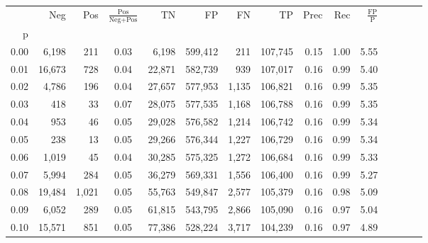 \begin{tabular}{rrrcrrrrrrrrrrr}
\toprule
{} &     Neg &    Pos & $\frac{\text{Pos}}{\text{Neg}+\text{Pos}}$ &       TN &       FP &       FN &       TP &  Prec &   Rec & $\frac{\text{FP}}{\text{P}}$ \\
p    &         &        &                                            &          &          &          &          &       &       &                              \\
\midrule
0.00 &   6,198 &    211 &                                       0.03 &    6,198 &  599,412 &      211 &  107,745 &  0.15 &  1.00 &                         5.55 \\
0.01 &  16,673 &    728 &                                       0.04 &   22,871 &  582,739 &      939 &  107,017 &  0.16 &  0.99 &                         5.40 \\
0.02 &   4,786 &    196 &                                       0.04 &   27,657 &  577,953 &    1,135 &  106,821 &  0.16 &  0.99 &                         5.35 \\
0.03 &     418 &     33 &                                       0.07 &   28,075 &  577,535 &    1,168 &  106,788 &  0.16 &  0.99 &                         5.35 \\
0.04 &     953 &     46 &                                       0.05 &   29,028 &  576,582 &    1,214 &  106,742 &  0.16 &  0.99 &                         5.34 \\
0.05 &     238 &     13 &                                       0.05 &   29,266 &  576,344 &    1,227 &  106,729 &  0.16 &  0.99 &                         5.34 \\
0.06 &   1,019 &     45 &                                       0.04 &   30,285 &  575,325 &    1,272 &  106,684 &  0.16 &  0.99 &                         5.33 \\
0.07 &   5,994 &    284 &                                       0.05 &   36,279 &  569,331 &    1,556 &  106,400 &  0.16 &  0.99 &                         5.27 \\
0.08 &  19,484 &  1,021 &                                       0.05 &   55,763 &  549,847 &    2,577 &  105,379 &  0.16 &  0.98 &                         5.09 \\
0.09 &   6,052 &    289 &                                       0.05 &   61,815 &  543,795 &    2,866 &  105,090 &  0.16 &  0.97 &                         5.04 \\
0.10 &  15,571 &    851 &                                       0.05 &   77,386 &  528,224 &    3,717 &  104,239 &  0.16 &  0.97 &                         4.89 \\

\end{tabular}
